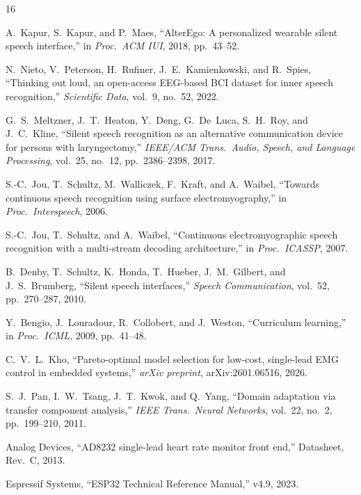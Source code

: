 \documentclass[11pt, a4paper]{article}
\begin{document}
\begin{thebibliography}{16}

A.\ Kapur, S.\ Kapur, and P.\ Maes, ``AlterEgo: A personalized wearable silent speech interface,'' in \emph{Proc.\ ACM IUI}, 2018, pp.\ 43--52.

N.\ Nieto, V.\ Peterson, H.\ Rufiner, J.~E.\ Kamienkowski, and R.\ Spies, ``Thinking out loud, an open-access EEG-based BCI dataset for inner speech recognition,'' \emph{Scientific Data}, vol.~9, no.~52, 2022.

G.~S.\ Meltzner, J.~T.\ Heaton, Y.\ Deng, G.\ De~Luca, S.~H.\ Roy, and J.~C.\ Kline, ``Silent speech recognition as an alternative communication device for persons with laryngectomy,'' \emph{IEEE/ACM Trans.\ Audio, Speech, and Language Processing}, vol.~25, no.~12, pp.\ 2386--2398, 2017.

S.-C.\ Jou, T.\ Schultz, M.\ Walliczek, F.\ Kraft, and A.\ Waibel, ``Towards continuous speech recognition using surface electromyography,'' in \emph{Proc.\ Interspeech}, 2006.

S.-C.\ Jou, T.\ Schultz, and A.\ Waibel, ``Continuous electromyographic speech recognition with a multi-stream decoding architecture,'' in \emph{Proc.\ ICASSP}, 2007.

B.\ Denby, T.\ Schultz, K.\ Honda, T.\ Hueber, J.~M.\ Gilbert, and J.~S.\ Brumberg, ``Silent speech interfaces,'' \emph{Speech Communication}, vol.~52, pp.\ 270--287, 2010.

Y.\ Bengio, J.\ Louradour, R.\ Collobert, and J.\ Weston, ``Curriculum learning,'' in \emph{Proc.\ ICML}, 2009, pp.\ 41--48.

C.~V.~L.\ Kho, ``Pareto-optimal model selection for low-cost, single-lead EMG control in embedded systems,'' \emph{arXiv preprint}, arXiv:2601.06516, 2026.

S.~J.\ Pan, I.~W.\ Tsang, J.~T.\ Kwok, and Q.\ Yang, ``Domain adaptation via transfer component analysis,'' \emph{IEEE Trans.\ Neural Networks}, vol.~22, no.~2, pp.\ 199--210, 2011.

Analog Devices, ``AD8232 single-lead heart rate monitor front end,'' Datasheet, Rev.~C, 2013.

Espressif Systems, ``ESP32 Technical Reference Manual,'' v4.9, 2023.




\end{thebibliography}
\end{document}

